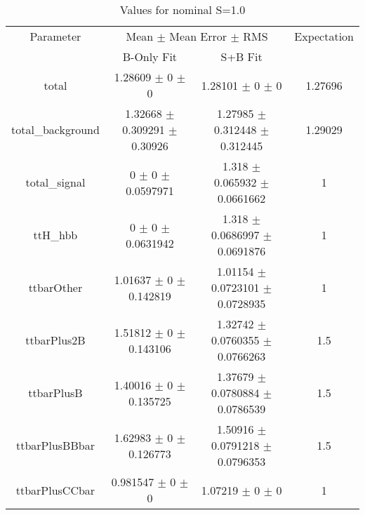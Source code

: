 \begin{table}
\centering
\caption{Values for nominal S=1.0}
\begin{tabular}{cccc}
\toprule
Parameter & \multicolumn{2}{c}{Mean $\pm$ Mean Error $\pm$ RMS} & Expectation\\
 & B-Only Fit & S+B Fit & \\
\midrule
total & \num{1.28609} $\pm$ \num{0} $\pm$ \num{0} & \num{1.28101} $\pm$ \num{0} $\pm$ \num{0} & \num{1.27696}\\
total\_background & \num{1.32668} $\pm$ \num{0.309291} $\pm$ \num{0.30926} & \num{1.27985} $\pm$ \num{0.312448} $\pm$ \num{0.312445} & \num{1.29029}\\
total\_signal & \num{0} $\pm$ \num{0} $\pm$ \num{0.0597971} & \num{1.318} $\pm$ \num{0.065932} $\pm$ \num{0.0661662} & \num{1}\\
ttH\_hbb & \num{0} $\pm$ \num{0} $\pm$ \num{0.0631942} & \num{1.318} $\pm$ \num{0.0686997} $\pm$ \num{0.0691876} & \num{1}\\
ttbarOther & \num{1.01637} $\pm$ \num{0} $\pm$ \num{0.142819} & \num{1.01154} $\pm$ \num{0.0723101} $\pm$ \num{0.0728935} & \num{1}\\
ttbarPlus2B & \num{1.51812} $\pm$ \num{0} $\pm$ \num{0.143106} & \num{1.32742} $\pm$ \num{0.0760355} $\pm$ \num{0.0766263} & \num{1.5}\\
ttbarPlusB & \num{1.40016} $\pm$ \num{0} $\pm$ \num{0.135725} & \num{1.37679} $\pm$ \num{0.0780884} $\pm$ \num{0.0786539} & \num{1.5}\\
ttbarPlusBBbar & \num{1.62983} $\pm$ \num{0} $\pm$ \num{0.126773} & \num{1.50916} $\pm$ \num{0.0791218} $\pm$ \num{0.0796353} & \num{1.5}\\
ttbarPlusCCbar & \num{0.981547} $\pm$ \num{0} $\pm$ \num{0} & \num{1.07219} $\pm$ \num{0} $\pm$ \num{0} & \num{1}\\
\bottomrule
\end{tabular}
\end{table}